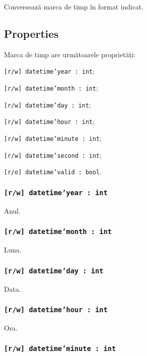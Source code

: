 Conversează marca de timp în format indicat.

\subsection{Properties}

Marca de timp are următoarele proprietăți:
\begin{icItems}
	\item \texttt{[r/w] datetime'year : int};
	\item \texttt{[r/w] datetime'month : int};
	\item \texttt{[r/w] datetime'day : int};
	\item \texttt{[r/w] datetime'hour : int};
	\item \texttt{[r/w] datetime'minute : int};
	\item \texttt{[r/w] datetime'second : int};
	\item \texttt{[r/o] datetime'valid : bool}.
\end{icItems}

\subsubsection{\texttt{[r/w] datetime'year : int}}

Anul.

\subsubsection{\texttt{[r/w] datetime'month : int}}

Luna.

\subsubsection{\texttt{[r/w] datetime'day : int}}

Data.

\subsubsection{\texttt{[r/w] datetime'hour : int}}

Ora.

\subsubsection{\texttt{[r/w] datetime'minute : int}}

